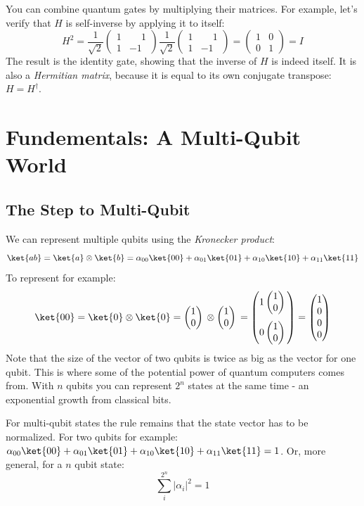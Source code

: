 \documentclass[11pt, notitlepage]{report}
\newcommand{\igate}{
  \begin{pmatrix}
  1 & 0 \\
  0 & 1
  \end{pmatrix}
}
\newcommand{\hgate}{
  \dfrac{1}{\sqrt2}
  \begin{pmatrix}
  1 & \phantom{-}1 \\
  1 & -1
  \end{pmatrix}
}
\newcommand{\qstatezero}{
  \begin{pmatrix}1 \\ 0\end{pmatrix}
}
\begin{document}
You can combine quantum gates by multiplying their matrices. For example, let's verify that $H$ is self-inverse by applying it to itself:
\[
  H^2 = \hgate{} \hgate{} = \igate{} = I
\]
The result is the identity gate, showing that the inverse of $H$ is indeed itself. It is also a \emph{Hermitian matrix}, because it is equal to its own conjugate transpose: $H = H^\dagger$.

\newpage

\chapter{Fundementals: A Multi-Qubit World}
\section{The Step to Multi-Qubit}
We can represent multiple qubits using the \emph{Kronecker product}:
\[
  \ket{ab} = \ket{a} \otimes \ket{b} = \alpha_{00}\ket{00} + \alpha_{01}\ket{01} + \alpha_{10}\ket{10} + \alpha_{11}\ket{11}
\]
To represent  for example:
\[
  \ket{00} = \ket{0} \otimes \ket{0} = \qstatezero{} \otimes \qstatezero{} =
  \begin{pmatrix}
  1\qstatezero{} \\[13pt]
  0\qstatezero{}
  \end{pmatrix}
  =
  \begin{pmatrix}
  1 \\
  0 \\
  0 \\
  0
  \end{pmatrix}
\]
Note that the size of the vector of two qubits is twice as big as the vector for one qubit. This is where some of the potential power of quantum computers comes from. With $n$ qubits you can represent $2^n$ states at the same time - an exponential growth from classical bits.

For multi-qubit states the rule remains that the state vector has to be normalized. For two qubits for example: $\alpha_{00}\ket{00} + \alpha_{01}\ket{01} + \alpha_{10}\ket{10} + \alpha_{11}\ket{11} = 1$. Or, more general, for a $n$ qubit state:
\[
\sum_{i}^{2^n} |\alpha_i|^2 = 1
\]
\end{document}

